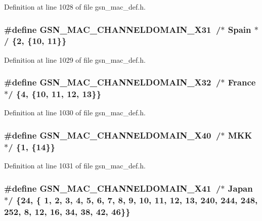 Definition at line 1028 of file gsn\_\-mac\_\-def.h.

\hypertarget{a00642_ga2fa52e7994dae2b65aa764cebd4b08a6}{
\subsubsection[{GSN\_\-MAC\_\-CHANNELDOMAIN\_\-X31}]{\setlength{\rightskip}{0pt plus 5cm}\#define GSN\_\-MAC\_\-CHANNELDOMAIN\_\-X31~/$\ast$ Spain  $\ast$/ \{2,  \{10, 11\}\}}}
\label{a00642_ga2fa52e7994dae2b65aa764cebd4b08a6}


Definition at line 1029 of file gsn\_\-mac\_\-def.h.

\hypertarget{a00642_ga674bc6383fba8ff146b4741af9ed8494}{
\subsubsection[{GSN\_\-MAC\_\-CHANNELDOMAIN\_\-X32}]{\setlength{\rightskip}{0pt plus 5cm}\#define GSN\_\-MAC\_\-CHANNELDOMAIN\_\-X32~/$\ast$ France $\ast$/ \{4,  \{10, 11, 12, 13\}\}}}
\label{a00642_ga674bc6383fba8ff146b4741af9ed8494}


Definition at line 1030 of file gsn\_\-mac\_\-def.h.

\hypertarget{a00642_ga28a20ad2b2d714e7729976e3778428a0}{
\subsubsection[{GSN\_\-MAC\_\-CHANNELDOMAIN\_\-X40}]{\setlength{\rightskip}{0pt plus 5cm}\#define GSN\_\-MAC\_\-CHANNELDOMAIN\_\-X40~/$\ast$ MKK    $\ast$/ \{1,  \{14\}\}}}
\label{a00642_ga28a20ad2b2d714e7729976e3778428a0}


Definition at line 1031 of file gsn\_\-mac\_\-def.h.

\hypertarget{a00642_gacb2f3c46d39cb7547bf13a2cf2da53c6}{
\subsubsection[{GSN\_\-MAC\_\-CHANNELDOMAIN\_\-X41}]{\setlength{\rightskip}{0pt plus 5cm}\#define GSN\_\-MAC\_\-CHANNELDOMAIN\_\-X41~/$\ast$ Japan  $\ast$/ \{24, \{ 1,  2,  3,  4,  5,  6,  7,  8,  9, 10, 11, 12, 13, 240, 244, 248, 252, 8, 12, 16, 34, 38, 42, 46\}\}}}
\label{a00642_gacb2f3c46d39cb7547bf13a2cf2da53c6}


